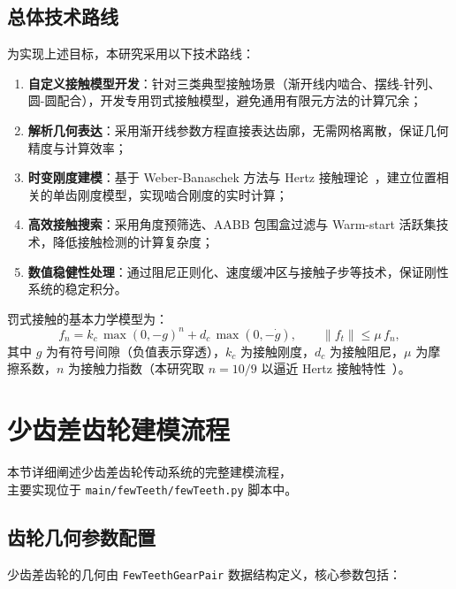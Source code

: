 \documentclass[12pt]{ctexart}
\begin{document}
\subsection{总体技术路线}
为实现上述目标，本研究采用以下技术路线：

\begin{enumerate}
  \item \textbf{自定义接触模型开发}：针对三类典型接触场景（渐开线内啮合、摆线-针列、圆-圆配合），开发专用罚式接触模型，避免通用有限元方法的计算冗余；
  \item \textbf{解析几何表达}：采用渐开线参数方程直接表达齿廓，无需网格离散，保证几何精度与计算效率；
  \item \textbf{时变刚度建模}：基于 Weber-Banaschek 方法与 Hertz 接触理论~\cite{johnson,litvin}，建立位置相关的单齿刚度模型，实现啮合刚度的实时计算；
  \item \textbf{高效接触搜索}：采用角度预筛选、AABB 包围盒过滤与 Warm-start 活跃集技术，降低接触检测的计算复杂度；
  \item \textbf{数值稳健性处理}：通过阻尼正则化、速度缓冲区与接触子步等技术，保证刚性系统的稳定积分。
\end{enumerate}

罚式接触的基本力学模型为：
\begin{equation}
 f_n = k_c \,\max(0,-g)^{n} + d_c \,\max(0,-\dot g), \qquad
 \|f_t\| \le \mu \, f_n ,
 \label{eq:penalty_contact}
\end{equation}
其中 $g$ 为有符号间隙（负值表示穿透），$k_c$ 为接触刚度，$d_c$ 为接触阻尼，$\mu$ 为摩擦系数，$n$ 为接触力指数（本研究取 $n=10/9$ 以逼近 Hertz 接触特性~\cite{johnson}）。

\section{少齿差齿轮建模流程}

本节详细阐述少齿差齿轮传动系统的完整建模流程，\\ 主要实现位于 \texttt{main/\allowbreak fewTeeth/\allowbreak fewTeeth.py} 脚本中。

\subsection{齿轮几何参数配置}

少齿差齿轮的几何由 \texttt{FewTeethGearPair} 数据结构定义，核心参数包括：
\end{document}
